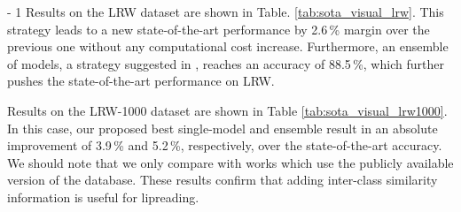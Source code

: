 \documentclass{article}
\begin{document}
\looseness - 1
Results on the LRW dataset are shown in Table. \ref{tab:sota_visual_lrw}. This strategy leads to a new state-of-the-art performance  by 2.6\,\% margin over the previous one without any computational cost increase. Furthermore, an ensemble of models, a strategy suggested in \cite{furlanello2018born}, reaches an accuracy of 88.5\,\%, which further pushes the state-of-the-art performance on LRW.

Results on the LRW-1000 dataset are shown in Table \ref{tab:sota_visual_lrw1000}. In this case, our proposed best single-model and ensemble result in an absolute improvement of 3.9\,\% and 5.2\,\%,  respectively, over the state-of-the-art accuracy. We should note that we only compare with works which use the publicly available version of the database. These results confirm that adding inter-class similarity information is  useful for lipreading.
\end{document}
